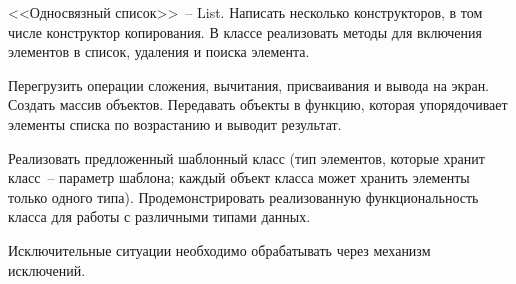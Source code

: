 
<<Односвязный список>>~-- List. Написать несколько конструкторов, в том числе
конструктор копирования. В классе реализовать методы для включения элементов в
список, удаления и поиска элемента.

Перегрузить операции сложения, вычитания,
присваивания и вывода на экран. Создать массив объектов. Передавать объекты в
функцию, которая упорядочивает элементы списка по возрастанию и выводит результат.

Реализовать предложенный шаблонный класс (тип элементов, которые
хранит класс~-- параметр шаблона; каждый объект класса может хранить
элементы только одного типа). Продемонстрировать реализованную
функциональность класса для работы с различными типами данных.

Исключительные ситуации необходимо обрабатывать через механизм исключений.

